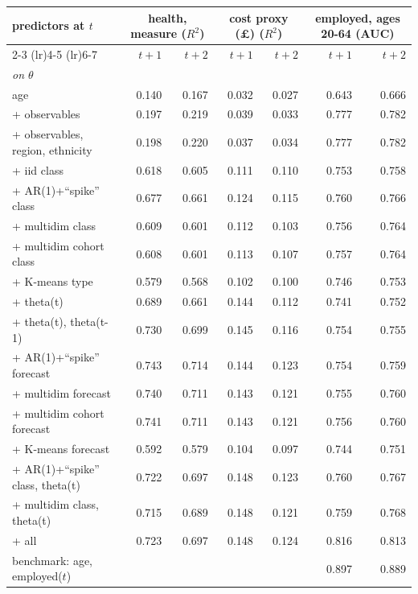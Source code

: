 \begin{tabular}{lrrrrrr}
\toprule
predictors at $t$ & \multicolumn{2}{c}{health, measure ($R^2$)} & \multicolumn{2}{c}{cost proxy (\pounds) ($R^2$)} & \multicolumn{2}{c}{employed, ages 20-64 (AUC)} \\
\cmidrule(lr){2-3} \cmidrule(lr){4-5} \cmidrule(lr){6-7}
 & $t+1$ & $t+2$ & $t+1$ & $t+2$ & $t+1$ & $t+2$ \\
\midrule
\multicolumn{7}{l}{\emph{on $\theta$}} \\
age & 0.140 & 0.167 & 0.032 & 0.027 & 0.643 & 0.666 \\
+ observables & 0.197 & 0.219 & 0.039 & 0.033 & 0.777 & 0.782 \\
+ observables, region, ethnicity & 0.198 & 0.220 & 0.037 & 0.034 & 0.777 & 0.782 \\
+ iid class & 0.618 & 0.605 & 0.111 & 0.110 & 0.753 & 0.758 \\
+ AR(1)+``spike'' class & 0.677 & 0.661 & 0.124 & 0.115 & 0.760 & 0.766 \\
+ multidim class & 0.609 & 0.601 & 0.112 & 0.103 & 0.756 & 0.764 \\
+ multidim cohort class & 0.608 & 0.601 & 0.113 & 0.107 & 0.757 & 0.764 \\
+ K-means type & 0.579 & 0.568 & 0.102 & 0.100 & 0.746 & 0.753 \\
+ theta(t) & 0.689 & 0.661 & 0.144 & 0.112 & 0.741 & 0.752 \\
+ theta(t), theta(t-1) & 0.730 & 0.699 & 0.145 & 0.116 & 0.754 & 0.755 \\
+ AR(1)+``spike'' forecast & 0.743 & 0.714 & 0.144 & 0.123 & 0.754 & 0.759 \\
+ multidim forecast & 0.740 & 0.711 & 0.143 & 0.121 & 0.755 & 0.760 \\
+ multidim cohort forecast & 0.741 & 0.711 & 0.143 & 0.121 & 0.756 & 0.760 \\
+ K-means forecast & 0.592 & 0.579 & 0.104 & 0.097 & 0.744 & 0.751 \\
+ AR(1)+``spike'' class, theta(t) & 0.722 & 0.697 & 0.148 & 0.123 & 0.760 & 0.767 \\
+ multidim class, theta(t) & 0.715 & 0.689 & 0.148 & 0.121 & 0.759 & 0.768 \\
+ all & 0.723 & 0.697 & 0.148 & 0.124 & 0.816 & 0.813 \\
\quad benchmark: age, employed($t$) &  &  &  &  & 0.897 & 0.889 \\
\bottomrule
\end{tabular}
